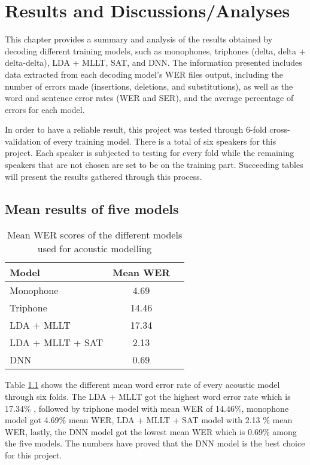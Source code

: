 \chapter{Results and Discussions/Analyses}
This chapter provides a summary and analysis of the results obtained by decoding different training models, such as monophones, triphones (delta, delta + delta-delta), LDA + MLLT, SAT, and DNN. The information presented includes data extracted from each decoding model's WER files output, including the number of errors made (insertions, deletions, and substitutions), as well as the word and sentence error rates (WER and SER), and the average percentage of errors for each model.

In order to have a reliable result, this project was tested through 6-fold cross-validation of every training model. There is a total of six speakers for this project. Each speaker is subjected to testing for every fold while the remaining speakers that are not chosen are set to be on the training part. Succeeding tables will present the results gathered through this process.

\section{Mean results of five models}
\begin{table}[htb]   %
	\setlength{\extrarowheight}{0.1em}
	\centering
	\caption{Mean WER scores of the different models used for acoustic modelling} 
	\begin{tabular}{|p{2in}|c|c|} \hline
		\centering Model & Mean WER \\ \hline
		Monophone & 4.69 \\ 
		Triphone & 14.46 \\ 
		LDA + MLLT & 17.34  \\ 
		LDA + MLLT + SAT & 2.13 \\ 
		DNN & 0.69  \\ \hline
	\end{tabular}
	\label{tab:mean_wer_models}
\end{table}

Table \ref{tab:mean_wer_models} shows the different mean word error rate of every acoustic model through six folds. The LDA + MLLT got the highest word error rate which is 17.34\% , followed by triphone model with mean WER of 14.46\%, monophone model got 4.69\% mean WER, LDA + MLLT + SAT model with 2.13 \% mean WER, lastly, the DNN model got the lowest mean WER which is 0.69\% among the five models. The numbers have proved that the DNN model is the best choice for this project.

